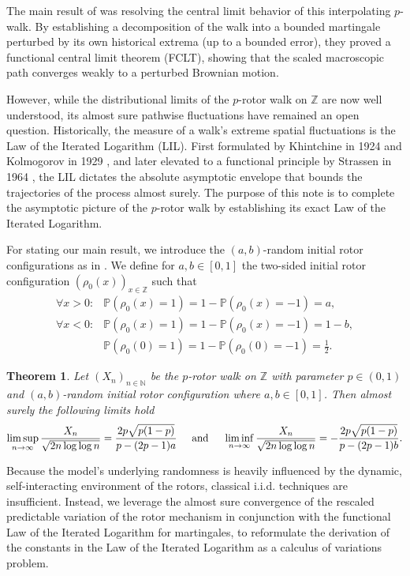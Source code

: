 \documentclass[11pt]{article}
\newtheorem{theorem}{Theorem}[section]
\theoremstyle{remark}
\newcommand{\N}{\mathbb{N}}
\newcommand{\Z}{\mathbb{Z}}
\begin{document}
The main result of \cite{HLSH18} was resolving the central limit behavior of this interpolating $p$-walk. By establishing a decomposition of the walk into a bounded martingale perturbed by its own historical extrema (up to a bounded error), they proved a functional central limit theorem (FCLT), showing that the scaled macroscopic path converges weakly to a perturbed Brownian motion.

However, while the distributional limits of the $p$-rotor walk on $\Z$ are now well understood, its almost sure pathwise fluctuations have remained an open question. Historically, the measure of a walk's extreme spatial fluctuations is the Law of the Iterated Logarithm (LIL). First formulated by Khintchine in 1924 \cite{K24} and Kolmogorov in 1929 \cite{K29}, and later elevated to a functional principle by Strassen in 1964 \cite{S64}, the LIL dictates the absolute asymptotic envelope that bounds the trajectories of the process almost surely. The purpose of this note is to complete the asymptotic picture of the $p$-rotor walk by establishing its exact Law of the Iterated Logarithm. 

For stating our main result, we introduce the $(a,b)$-random initial rotor configurations as in \cite{HLSH18}. We define for $a,b\in[0,1]$ the two-sided initial rotor configuration $(\rho_0(x))_{x\in\Z}$ such that
\begin{align*}
    \forall x>0:&\mathbb{P}(\rho_0(x)=1)=1-\mathbb{P}(\rho_0(x)=-1)=a,\\
    \forall x<0:&\mathbb{P}(\rho_0(x)=1)=1-\mathbb{P}(\rho_0(x)=-1)=1-b,\\
    &\mathbb{P}(\rho_0(0)=1)=1-\mathbb{P}(\rho_0(0)=-1)=\frac{1}{2}.
\end{align*}

\begin{theorem}\label{thm:main}
    Let $(X_n)_{n\in\N}$ be the $p$-rotor walk on $\mathbb{Z}$ with parameter $p \in (0,1)$ and $(a,b)$-random initial rotor configuration where $a, b \in [0,1]$. Then almost surely the following limits hold
    $$\limsup_{n \to \infty} \frac{X_n}{\sqrt{2n \log \log n}} = \frac{2p\sqrt{p(1-p)}}{p-(2p-1)a}\hspace{0.5cm}
    \text{and}\hspace{0.5cm}
    \liminf_{n \to \infty} \frac{X_n}{\sqrt{2n \log \log n}} = -\frac{2p\sqrt{p(1-p)}}{p-(2p-1)b}.$$
\end{theorem}

Because the model's underlying randomness is heavily influenced by the dynamic, self-interacting environment of the rotors, classical i.i.d. techniques are insufficient. Instead, we leverage the almost sure convergence of the rescaled predictable variation of the rotor mechanism in conjunction with the functional Law of the Iterated Logarithm for martingales, to reformulate the derivation of the constants in the Law of the Iterated Logarithm as a calculus of variations problem.
\end{document}
